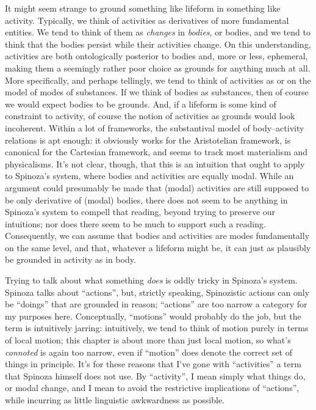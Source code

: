 \documentclass{article}
\newcommand{\dash}{\unskip{—}}
\begin{document}
It might seem strange to ground something like lifeform in something like activity. Typically, we think of activities as derivatives of more fundamental entities. We tend to think of them as \emph{changes} in \emph{bodies}, or bodies, and we tend to think that the bodies persist while their activities change. On this understanding, activities are both ontologically posterior to bodies and, more or less, ephemeral, making them a seemingly rather poor choice as grounds for anything much at all. More specifically, and perhaps tellingly, we tend to think of activities as \dash or on the model of \dash modes of substances. If we think of bodies as substances, then of course we would expect bodies to be grounds. And, if a lifeform is some kind of constraint to activity, of course the notion of activities as grounds would look incoherent. Within a lot of frameworks, the substantival model of body–activity relations is apt enough: it obviously works for the Aristotelian framework, is canonical for the Cartesian framework, and seems to track most materialism and physicalisms. It's not clear, though, that this is an intuition that ought to apply to Spinoza's system, where bodies and activities are equally modal. While an argument could presumably be made that (modal) activities are still supposed to be only derivative of (modal) bodies, there does not seem to be anything in Spinoza's system to compell that reading, beyond trying to preserve our intuitions; nor does there seem to be much to support such a reading. Consequently, we can assume that bodies and activities are modes fundamentally on the same level, and that, whatever a lifeform might be, it can just as plausibly be grounded in activity as in body.

Trying to talk about what something \emph{does} is oddly tricky in Spinoza's system. Spinoza talks about \enquote{actions}, but, strictly speaking, Spinozistic actions can only be \enquote{doings} that are grounded in reason; \enquote{actions} are too narrow a category for my purposes here. Conceptually, \enquote{motions} would probably do the job, but the term is intuitively jarring: intuitively, we tend to think of motion purely in terms of local motion; this chapter is about more than just local motion, so what's \emph{connoted} is again too narrow, even if \enquote{motion} does denote the correct set of things in principle. It's for these reasons that I've gone with \enquote{activities} \dash a term that Spinoza himself does not use. By \enquote{activity}, I mean simply what things do, or modal change, and I mean to avoid the restrictive implications of \enquote{actions}, while incurring as little linguistic awkwardness as possible.
\end{document}

